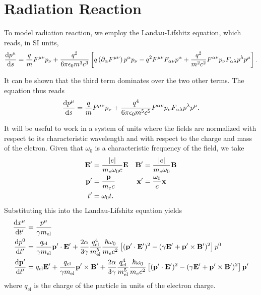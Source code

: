 \documentclass[10pt,letterpaper,extrafontsizes, onecolumn,openright]{memoir}
\begin{document}
\section{Radiation Reaction}

To model radiation reaction, we employ the Landau-Lifshitz equation, which
reads, in SI units,
  \begin{equation}
    \dv{p^\mu}{s} = \frac{q}{m}F^{\mu\nu}p_\nu
                   +\frac{q^2}{6\pi\epsilon_0m^3c^3}
                      \left[
                        q\left(\partial_\alpha F^{\mu\nu}\right)p^\alpha p_\nu
                      - q^2 F^{\mu\nu}F_{\alpha\nu}p^\alpha
                      + \frac{q^2}{m^2c^2} F^{\alpha\nu}p_\nu F_{\alpha\lambda}p^\lambda p^\mu
                      \right].
  \end{equation}

It can be shown \cite{} that the third term dominates over the two other terms.
The equation thus reads
  \begin{equation}
    \dv{p^\mu}{s} = \frac{q}{m}F^{\mu\nu}p_\nu
                   +\frac{q^4}{6\pi\epsilon_0m^5c^5}F^{\alpha\nu}p_\nu F_{\alpha\lambda}p^\lambda p^\mu.
  \end{equation}

It will be useful to work in a system of units where the fields are normalized with
respect to its characteristic wavelength and with respect to the charge and mass
of the elctron. Given that $\omega_0$ is a characteristic frequency of the field,
we take
  \begin{subequations}
  \begin{align}
    \vb{E}' &= \frac{|e|}{m_e\omega_0 c} \vb{E} & \vb{B}' &= \frac{|e|}{m_e\omega_0}\vb{B} \\
    \vb{p}' &= \frac{\vb{p}}{m_ec}              & \vb{x}' &= \frac{\omega_0}{c}\vb{x}    \\
    t'      &= \omega_0 t.
  \end{align}
  \end{subequations}
Substituting this into the Landau-Lifshitz equation yields
  \begin{align}
  	\dv{x^\mu}{t'}   &= \frac{p^\mu}{\gamma m_\text{el}} \\
    \dv{p^0}{t'}     &= \frac{q_\text{el}}{\gamma m_\text{el}}\vb{p}'\cdot\vb{E}'
                       +\frac{2\alpha}{3\gamma}\frac{q_\text{el}^4}{m_\text{el}^5}\frac{\hbar\omega_0}{m_ec^2}
                      \left[(\vb{p}'\cdot\vb{E}')^2-(\gamma\vb{E}'+\vb{p}'\times\vb{B}')^2\right]p^0 \\
    \dv{\vb{p}'}{t'} &= q_\text{el}\vb{E}' +\frac{q_\text{el}}{\gamma m_\text{el}}\vb{p}'\times\vb{B}'
                      +\frac{2\alpha}{3\gamma}\frac{q_\text{el}^4}{m_\text{el}^5}\frac{\hbar\omega_0}{m_ec^2}
                      \left[(\vb{p}'\cdot\vb{E}')^2-(\gamma\vb{E}'+\vb{p}'\times\vb{B}')^2\right]\vb{p}'
  \end{align}
where $q_\text{el}$ is the charge of the particle in units of the electron charge.
\end{document}
